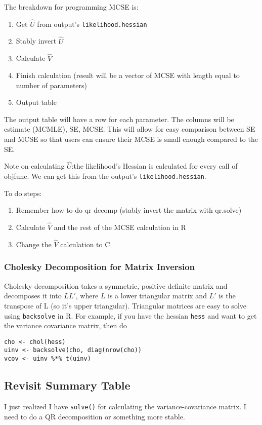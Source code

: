 \documentclass{article}
\begin{document}
The breakdown for programming MCSE is:
\begin{enumerate}
\item Get $\hat{U}$ from output's \texttt{likelihood.hessian}
\item Stably invert $\hat{U}$
\item Calculate $\hat{V}$
\item Finish calculation (result will be a vector of MCSE with length equal to number of parameters)
\item Output table
\end{enumerate}
The output table will have a row for each parameter. The columns will be estimate (MCMLE), SE, MCSE. This will allow for easy comparison between SE and MCSE so that users can ensure their MCSE is small enough compared to the SE.

Note on calculating $\hat{U}$:the likelihood's Hessian is calculated for every call of objfunc. We can get this from the output's \texttt{likelihood.hessian}.

To do steps:
\begin{enumerate}
\item Remember how to do qr decomp (stably invert the matrix with qr.solve)
\item Calculate $\hat{V}$ and the rest of the MCSE calculation in R
\item Change the  $\hat{V}$ calculation to C
\end{enumerate}


\subsubsection{Cholesky Decomposition for Matrix Inversion}
Cholesky decomposition takes a symmetric, positive definite matrix and decomposes it into $LL'$, where $L$ is a lower triangular matrix and $L'$ is the transpose of L (so it's upper triangular). Triangular matrices are easy to solve using \texttt{backsolve} in R. For example, if you have the hessian \texttt{hess} and want to get the variance covariance matrix, then do 
\begin{verbatim}
cho <- chol(hess)
uinv <- backsolve(cho, diag(nrow(cho))
vcov <- uinv %*% t(uinv)
\end{verbatim}


\subsection{Revisit Summary Table}
I just realized I have \texttt{solve()} for calculating the variance-covariance matrix. I need to do a QR decomposition or something more stable.
\end{document}
